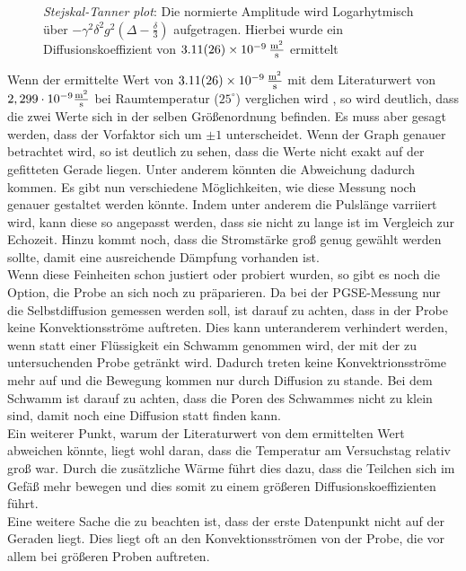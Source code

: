 \begin{figure}[H]
    \centering
    
    \caption[Bestimmung des selbst Diffusionskoeffizienten mithilfe von dem Stejskal-Tanner plot]{\textit{Stejskal-Tanner plot}: Die normierte Amplitude wird Logarhytmisch über $-\gamma^2\delta^2g^2\left(\Delta-\frac{\delta}{3}\right)$ aufgetragen. Hierbei wurde ein Diffusionskoeffizient von $\SI{3,11(26)e-9}{\frac{\m^2}{s}}$ ermittelt}
\end{figure}
 Wenn der ermittelte Wert von $\SI{3,11(26)e-9}{\frac{\m^2}{s}}$ mit dem Literaturwert von $2,299 \cdot 10^{-9}\si{\frac{\m^2}{\s}}$ bei Raumtemperatur ($25^{\circ}$) verglichen wird \cite{Diff}, so wird deutlich, dass die zwei Werte sich in der selben Größenordnung befinden. Es muss aber gesagt werden, dass der Vorfaktor sich um $\pm 1$ unterscheidet. Wenn der Graph  genauer betrachtet wird, so ist deutlich zu sehen, dass die Werte nicht exakt auf der gefitteten Gerade liegen. Unter anderem könnten die Abweichung dadurch kommen. 
Es gibt nun verschiedene Möglichkeiten, wie diese Messung noch genauer gestaltet werden könnte. Indem unter anderem die Pulslänge varriiert wird, kann diese so angepasst werden, dass sie nicht zu lange ist im Vergleich zur Echozeit. Hinzu kommt noch, dass die Stromstärke groß genug gewählt werden sollte, damit eine ausreichende Dämpfung vorhanden ist.\\
Wenn diese Feinheiten schon justiert oder probiert wurden, so gibt es noch die Option, die Probe an sich noch zu präparieren. Da bei der PGSE-Messung nur die Selbstdiffusion gemessen werden soll, ist darauf zu achten, dass in der Probe keine Konvektionsströme auftreten. Dies kann unteranderem verhindert werden, wenn statt einer Flüssigkeit ein Schwamm genommen wird, der mit der zu untersuchenden Probe getränkt wird. Dadurch treten keine Konvektrionsströme mehr auf und die Bewegung kommen nur durch Diffusion zu stande. Bei dem Schwamm ist darauf zu achten, dass die Poren des Schwammes nicht zu klein sind, damit noch eine Diffusion statt finden kann.\\
Ein weiterer Punkt, warum der Literaturwert von dem ermittelten Wert abweichen könnte, liegt wohl daran, dass die Temperatur am Versuchstag relativ groß war. Durch die zusätzliche Wärme führt dies dazu, dass die Teilchen sich im Gefäß mehr bewegen und dies somit zu einem größeren Diffusionskoeffizienten führt.\\
Eine weitere Sache die zu beachten ist, dass der erste Datenpunkt nicht auf der Geraden liegt. Dies liegt oft an den Konvektionsströmen von der Probe, die vor allem bei größeren Proben auftreten.